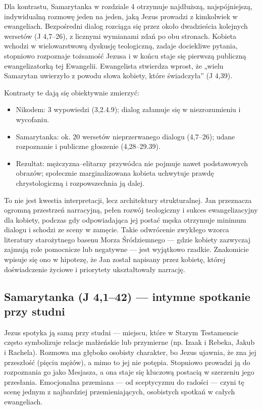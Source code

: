 Dla kontrastu, Samarytanka w rozdziale 4 otrzymuje najdłuższą, najspójniejszą, indywidualną rozmowę jeden na jeden, jaką Jezus prowadzi z kimkolwiek w ewangeliach.
Bezpośredni dialog rozciąga się przez około dwadzieścia kolejnych wersetów (J 4,7--26), z licznymi wymianami zdań po obu stronach.
Kobieta wchodzi w wielowarstwową dyskusję teologiczną, zadaje dociekliwe pytania, stopniowo rozpoznaje tożsamość Jezusa i w końcu staje się pierwszą publiczną ewangelizatorką tej Ewangelii.
Ewangelista stwierdza wprost, że „wielu Samarytan uwierzyło z powodu słowa kobiety, które świadczyła” (J 4,39).

Kontrasty te dają się obiektywnie zmierzyć:

\begin{itemize}
\item Nikodem: 3 wypowiedzi (3,2.4.9); dialog załamuje się w niezrozumieniu i wycofaniu.
\item Samarytanka: ok. 20 wersetów nieprzerwanego dialogu (4,7--26); udane rozpoznanie i publiczne głoszenie (4,28--29.39).
\item Rezultat: mężczyzna–elitarny przywódca nie pojmuje nawet podstawowych obrazów; społecznie marginalizowana kobieta uchwytuje prawdę chrystologiczną i rozpowszechnia ją dalej.
\end{itemize}

To nie jest kwestia interpretacji, lecz architektury strukturalnej.
Jan przeznacza ogromną przestrzeń narracyjną, pełen rozwój teologiczny i sukces ewangelizacyjny dla kobiety, podczas gdy odpowiadająca jej postać męska otrzymuje minimum dialogu i schodzi ze sceny w zamęcie.
Takie odwrócenie zwykłego wzorca literatury starożytnego basenu Morza Śródziemnego — gdzie kobiety zazwyczaj zajmują role pomocnicze lub negatywne — jest wyjątkowo rzadkie.
Znakomicie wpisuje się ono w hipotezę, że Jan został napisany przez kobietę, której doświadczenie życiowe i priorytety ukształtowały narrację.

\subsection{Samarytanka (J 4,1--42) --- intymne spotkanie przy studni}\label{subsec:the-samaritan-woman-john-41-42-an-intimate-encounter-at-the-well}

Jezus spotyka ją samą przy studni — miejscu, które w Starym Testamencie często symbolizuje relacje małżeńskie lub przymierne (np. Izaak i Rebeka, Jakub i Rachela).
Rozmowa ma głęboko osobisty charakter, bo Jezus ujawnia, że zna jej przeszłość (pięciu mężów), a mimo to jej nie potępia.
Stopniowo prowadzi ją do rozpoznania go jako Mesjasza, a ona staje się kluczową postacią w szerzeniu jego przesłania.
Emocjonalna przemiana — od sceptycyzmu do radości — czyni tę scenę jednym z najbardziej przemieniających, osobistych spotkań w całych ewangeliach.

